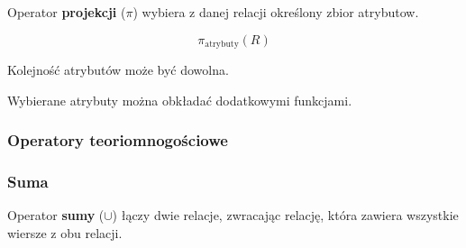 Operator \textbf{projekcji} (\( \pi \)) wybiera z danej relacji określony zbior atrybutow.

\[
    \pi_{\text{atrybuty}}(R)
\]

Kolejność atrybutów może być dowolna.

Wybierane atrybuty można obkładać dodatkowymi funkcjami.

\subsubsection*{Operatory teoriomnogościowe}

\subsubsection*{Suma}

Operator \textbf{sumy} (\( \cup \)) łączy dwie relacje, zwracając relację, która zawiera wszystkie wiersze z obu relacji.
